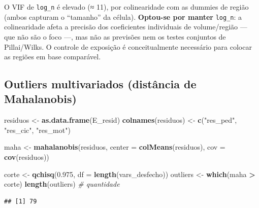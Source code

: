 \documentclass[
  11pt,
]{article}
\newenvironment{Shaded}{\begin{snugshade}}{\end{snugshade}}
\newcommand{\AttributeTok}[1]{\textcolor[rgb]{0.13,0.29,0.53}{#1}}
\newcommand{\CommentTok}[1]{\textcolor[rgb]{0.56,0.35,0.01}{\textit{#1}}}
\newcommand{\DecValTok}[1]{\textcolor[rgb]{0.00,0.00,0.81}{#1}}
\newcommand{\FloatTok}[1]{\textcolor[rgb]{0.00,0.00,0.81}{#1}}
\newcommand{\FunctionTok}[1]{\textcolor[rgb]{0.13,0.29,0.53}{\textbf{#1}}}
\newcommand{\NormalTok}[1]{#1}
\newcommand{\OtherTok}[1]{\textcolor[rgb]{0.56,0.35,0.01}{#1}}
\newcommand{\SpecialCharTok}[1]{\textcolor[rgb]{0.81,0.36,0.00}{\textbf{#1}}}
\newcommand{\StringTok}[1]{\textcolor[rgb]{0.31,0.60,0.02}{#1}}
\begin{document}
O VIF de \texttt{log\_n} é elevado (≈ 11), por colinearidade com as
dummies de região (ambos capturam o ``tamanho'' da célula).
\textbf{Optou-se por manter} \texttt{log\_n}: a colinearidade afeta a
precisão dos coeficientes individuais de volume/região --- que não são o
foco ---, mas não as previsões nem os testes conjuntos de Pillai/Wilks.
O controle de exposição é conceitualmente necessário para colocar as
regiões em base comparável.

\subsection{Outliers multivariados (distância de
Mahalanobis)}\label{outliers-multivariados-distuxe2ncia-de-mahalanobis}

\begin{Shaded}
\begin{Highlighting}[]
\NormalTok{residuos }\OtherTok{\textless{}{-}} \FunctionTok{as.data.frame}\NormalTok{(E\_resid)}
\FunctionTok{colnames}\NormalTok{(residuos) }\OtherTok{\textless{}{-}} \FunctionTok{c}\NormalTok{(}\StringTok{"res\_ped"}\NormalTok{, }\StringTok{"res\_cic"}\NormalTok{, }\StringTok{"res\_mot"}\NormalTok{)}

\NormalTok{maha }\OtherTok{\textless{}{-}} \FunctionTok{mahalanobis}\NormalTok{(residuos,}
                    \AttributeTok{center =} \FunctionTok{colMeans}\NormalTok{(residuos),}
                    \AttributeTok{cov    =} \FunctionTok{cov}\NormalTok{(residuos))}

\NormalTok{corte }\OtherTok{\textless{}{-}} \FunctionTok{qchisq}\NormalTok{(}\FloatTok{0.975}\NormalTok{, }\AttributeTok{df =} \FunctionTok{length}\NormalTok{(vars\_desfecho))}
\NormalTok{outliers }\OtherTok{\textless{}{-}} \FunctionTok{which}\NormalTok{(maha }\SpecialCharTok{\textgreater{}}\NormalTok{ corte)}
\FunctionTok{length}\NormalTok{(outliers)               }\CommentTok{\# quantidade}
\end{Highlighting}
\end{Shaded}

\begin{verbatim}
## [1] 79
\end{verbatim}

\begin{Shaded}
\end{Shaded}
\end{document}
